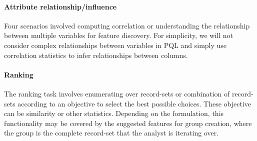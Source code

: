 \documentclass{sig-alternate-05-2015}
\begin{document}
\paragraph{Attribute relationship/influence}
Four scenarios involved computing correlation or understanding the relationship between multiple variables for feature discovery. For simplicity, we will not consider complex relationships between variables in PQL and simply use correlation statistics to infer relationships between columns.
\paragraph{Ranking}
The ranking task involves enumerating over record-sets or combination of record-sets according to an objective to select the best possible choices. These objective can be similarity or other statistics. Depending on the formulation, this functionality may be covered by the suggested features for group creation, where the group is the complete record-set that the analyst is iterating over.
\end{document}

